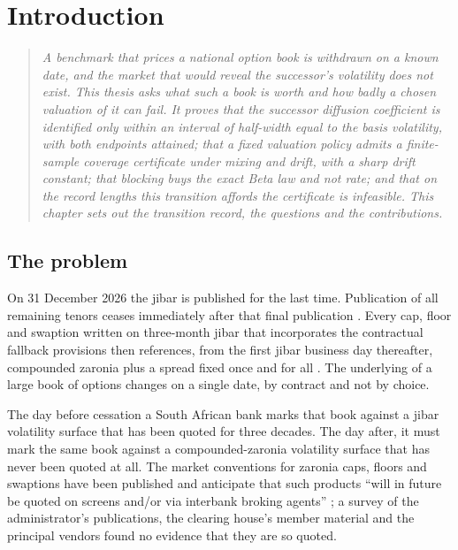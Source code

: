 \documentclass[../../../main.tex]{subfiles}
\begin{document}
\chapter{Introduction}\label{ch1-introduction}\label{ch:intro}

\begin{quote}\itshape
A benchmark that prices a national option book is withdrawn on a known date, and the market that would reveal the successor's volatility does not exist. This thesis asks what such a book is worth and how badly a chosen valuation of it can fail. It proves that the successor diffusion coefficient is identified only within an interval of half-width equal to the basis volatility, with both endpoints attained; that a fixed valuation policy admits a finite-sample coverage certificate under mixing and drift, with a sharp drift constant; that blocking buys the exact Beta law and not rate; and that on the record lengths this transition affords the certificate is infeasible. This chapter sets out the transition record, the questions and the contributions.
\end{quote}

\section{The problem}\label{sec:intro-problem}

On 31 December 2026 the \gls{jibar} is published for the last time. Publication of all remaining tenors ceases immediately after that final publication \citep[p.~1]{isda2025}. Every cap, floor and swaption written on three-month \gls{jibar} that incorporates the contractual fallback provisions then references, from the first \gls{jibar} business day thereafter, compounded \gls{zaronia} plus a spread fixed once and for all \citep[Sects.~2--3]{isda2025}. The underlying of a large book of options changes on a single date, by contract and not by choice.

The day before cessation a South African bank marks that book against a \gls{jibar} volatility surface that has been quoted for three decades. The day after, it must mark the same book against a compounded-\gls{zaronia} volatility surface that has never been quoted at all. The market conventions for \gls{zaronia} caps, floors and swaptions have been published and anticipate that such products ``will in future be quoted on screens and/or via interbank broking agents'' \citep[\S3, p.~5]{sarb2024conv}; a survey of the administrator's publications, the clearing house's member material and the principal vendors found no evidence that they are so quoted.
\end{document}
